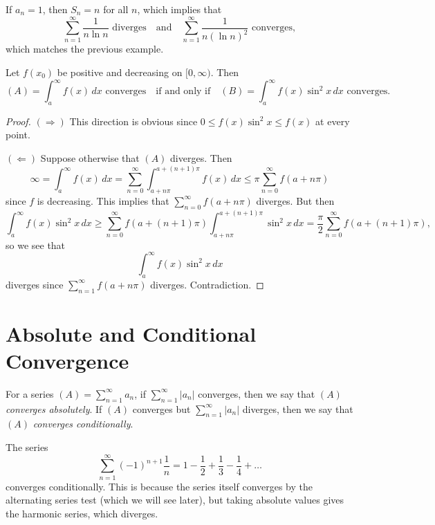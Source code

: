 \begin{remark}
  If $a_n = 1$, then $S_n = n$ for all $n$, which implies
  that
  \[
    \sum_{n = 1}^\infty \frac{1}{n \ln n} \text{ diverges}
    \quad \text{and} \quad
    \sum_{n = 1}^\infty \frac{1}{n (\ln n)^2} \text{ converges},
  \]
  which matches the previous example.
\end{remark}

\begin{example}
  Let $f(x_0)$ be positive and decreasing on
  $[0, \infty)$. Then
  \[
    (A) = \int_a^\infty f(x)\, dx \text{ converges} \quad
  \text{if and only if} \quad
  (B) = \int_a^\infty f(x) \sin^2 x\, dx \text{ converges}.
  \]
\end{example}

\begin{proof}
  $(\Rightarrow)$ This direction is obvious since
  $0 \le f(x) \sin^2 x \le f(x)$ at every point.

  $(\Leftarrow)$ Suppose otherwise that $(A)$ diverges. Then
  \[
    \infty = \int_a^\infty f(x)\, dx
    = \sum_{n = 0}^\infty \int_{a + n\pi}^{a + (n + 1)\pi}
    f(x)\, dx
    \le \pi \sum_{n = 0}^\infty f(a + n\pi)
  \]
  since $f$ is decreasing. This implies that
  $\sum_{n = 0}^\infty f(a + n\pi)$ diverges. But then
  \[
    \int_a^\infty f(x) \sin^2 x\, dx
    \ge \sum_{n = 0}^\infty f(a + (n + 1)\pi) \int_{a + n\pi}^{a + (n + 1)\pi} \sin^2 x\, dx
    = \frac{\pi}{2}\sum_{n = 0}^\infty f(a + (n + 1)\pi),
  \]
  so we see that
  \[
    \int_a^\infty f(x) \sin^2 x\, dx
  \]
  diverges since $\sum_{n = 1}^\infty f(a + n\pi)$ diverges. Contradiction.
\end{proof}

\section{Absolute and Conditional Convergence}

\begin{definition}
  For a series $(A) = \sum_{n = 1}^\infty a_n$, if
  $\sum_{n = 1}^\infty |a_n|$ converges, then we say that
  $(A)$ \emph{converges absolutely}. If $(A)$ converges
  but $\sum_{n = 1}^\infty |a_n|$ diverges, then we say
  that $(A)$ \emph{converges conditionally}.
\end{definition}

\begin{example}
  The series
  \[
    \sum_{n = 1}^\infty (-1)^{n + 1} \frac{1}{n}
    = 1 - \frac{1}{2} + \frac{1}{3} - \frac{1}{4} + \dots
  \]
  converges conditionally. This is because the series
  itself converges by the alternating series test (which
  we will see later), but
  taking absolute values gives the harmonic series,
  which diverges.
\end{example}

